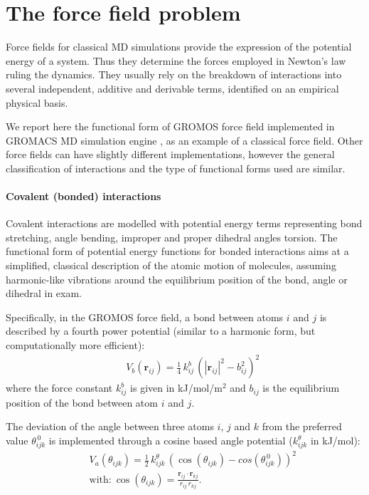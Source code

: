 \section{The force field problem} \label{sec:ff}

Force fields for classical MD simulations provide the expression of the potential energy of a system. Thus they determine the forces employed in Newton's law ruling the dynamics.
%
They usually rely on the breakdown of interactions into several independent, additive and derivable terms, identified on an empirical physical basis.

We report here the functional form of GROMOS force field \citep{Oostenbrink2004,Schmid2011,Reif2012} implemented in GROMACS MD simulation engine \citep{Berendsen1995,Abraham2015,gromacs_man}, as an example of a classical force field.
%
Other force fields can have slightly different implementations, however the general classification of interactions and the type of functional forms used are similar.

\paragraph{Covalent (bonded) interactions} Covalent interactions are modelled with potential energy terms representing bond stretching, angle bending, improper and proper dihedral angles torsion.
%
The functional form of potential energy functions for bonded interactions aims at a simplified, classical description of the atomic motion of molecules, assuming harmonic-like vibrations around the equilibrium position of the bond, angle or dihedral in exam.

Specifically, in the GROMOS force field, a bond between atoms $i$ and $j$ is described by a fourth power potential (similar to a harmonic form, but computationally more efficient):
\begin{eqnarray}
&& V_b(\textbf{r}_{ij}) = \frac{1}{4}\,k^b_{ij}\,\left(|\textbf{r}_{ij}|^2 - b_{ij}^2\right)^2
\end{eqnarray}
where the force constant $k^b_{ij}$ is given in kJ/mol/m$^2$ and $b_{ij}$ is the equilibrium position of the bond between atom $i$ and $j$.

The deviation of the angle between three atoms $i$, $j$ and $k$ from the preferred value $\theta^{\, 0}_{ijk}$ is implemented through a cosine based angle potential ($k^\theta_{ijk}$ in kJ/mol):
\begin{eqnarray}
&& V_a(\theta_{ijk}) = \frac{1}{2}\,k^\theta_{ijk}\,\left(\cos\left(\theta_{ijk}\right) - cos\left(\theta^{\, 0}_{ijk}\right)\right)^2 \\
&& \text{with:} \ \cos\left(\theta_{ijk}\right) = \frac{\textbf{r}_{ij}\cdot \textbf{r}_{kj}}{r_{ij}\,r_{kj}}.
\end{eqnarray}

